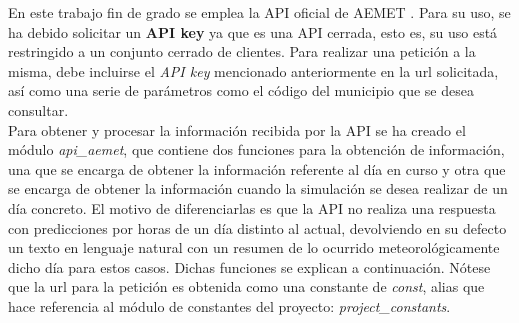 En este trabajo fin de grado se emplea la API oficial de AEMET \cite{Aemet}. Para su uso, se ha debido solicitar un \textbf{API key} ya que es una API cerrada, esto es, su uso está restringido a un conjunto cerrado de clientes. Para realizar una petición a la misma, debe incluirse el \textit{API key} mencionado anteriormente en la url solicitada, así como una serie de parámetros como el código del municipio que se desea consultar.\\

Para obtener y procesar la información recibida por la API se ha creado el módulo \textit{api\_aemet}, que contiene dos funciones para la obtención de información, una que se encarga de obtener la información referente al día en curso y otra que se encarga de obtener la información cuando la simulación se desea realizar de un día concreto. El motivo de diferenciarlas es que la API no realiza una respuesta con predicciones por horas de un día distinto al actual, devolviendo en su defecto un texto en lenguaje natural con un resumen de lo ocurrido meteorológicamente dicho día para estos casos. Dichas funciones se explican a continuación. Nótese que la url para la petición es obtenida como una constante de \textit{const}, alias que hace referencia al módulo de constantes del proyecto: \textit{project\_constants}.
